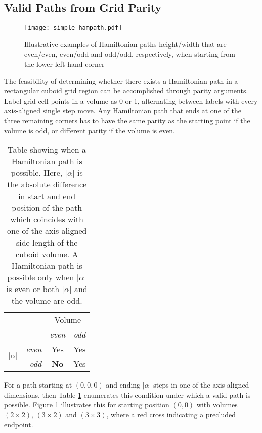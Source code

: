 \subsection{Valid Paths from Grid Parity}

\begin{figure}[h]
  \centering
  \texttt{[image: simple\_hampath.pdf]}
  \caption{ Illustrative examples of Hamiltonian paths height/width that are even/even, even/odd and odd/odd, respectively,
            when starting from the lower left hand corner }
  \label{fig:exampleHampath}
\end{figure}


The feasibility of determining whether there exists a Hamiltonian path in a rectangular cuboid
grid region can be accomplished through parity arguments.
Label grid cell points in a volume as 0 or 1,
alternating between labels with every axis-aligned single step move.
Any Hamiltonian path that ends at one of the three remaining corners has to have the same parity as the starting point if the
volume is odd, or different parity if the volume is even.

\begin{table}[h]
  \centering
  \begin{tabular}[t]{cr|cc}
    \multicolumn{2}{c}{ \multirow{2}{*}{Path Possible} } & \multicolumn{2}{c}{Volume} \\
    & & \textit{even} & \textit{odd} \\
    \hline
      \multirow{2}{*}{ $|\alpha|$ } & \textit{even} & Yes & Yes \\
       & \textit{odd} & \textbf{No} & Yes \\
     \hline
  \end{tabular}
  \caption{ Table showing when a Hamiltonian path is possible. Here, $|\alpha|$ is the absolute difference in start and end position of the path which
            coincides with one of the axis aligned side length of the cuboid volume. A Hamiltonian path is possible only when $|\alpha|$ is even or both
            $|\alpha|$ and the volume are odd. }
  \label{table:pathTable}
\end{table}


For a path starting at $(0,0,0)$ and ending $|\alpha|$ steps in one of the axis-aligned dimensions,
then Table \ref{table:pathTable} enumerates this condition under which a valid path is possible.
Figure \ref{fig:exampleHampath} illustrates this for starting position $(0,0)$ with volumes $(2 \times 2)$, $(3 \times 2)$ and $(3 \times 3)$,
where a red cross indicating a precluded endpoint.

